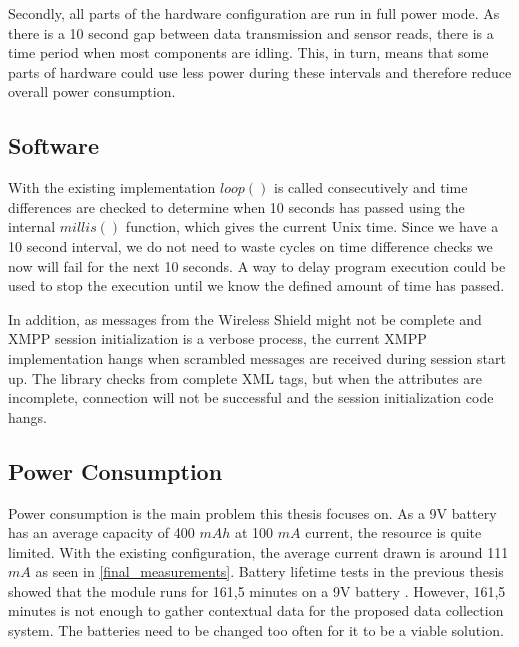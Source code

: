 Secondly, all parts of the hardware configuration are run in full power mode. As there is a 10 second gap between data transmission and sensor reads, there is a time period when most components are idling. This, in turn, means that some parts of hardware could use less power during these intervals and therefore reduce overall power consumption.

\subsection{Software}

With the existing implementation $loop()$ is called consecutively and time differences are checked to determine when 10 seconds has passed using the internal $millis()$ function, which gives the current Unix time. Since we have a 10 second interval, we do not need to waste cycles on time difference checks we now will fail for the next 10 seconds. A way to delay program execution could be used to stop the execution until we know the defined amount of time has passed. 

In addition, as messages from the Wireless Shield might not be complete and  XMPP session initialization is a verbose process, the current XMPP implementation hangs when scrambled messages are received during session start up. The library checks from complete XML tags, but when the attributes are incomplete, connection will not be successful and the session initialization code hangs.

\subsection{Power Consumption}

Power consumption is the main problem this thesis focuses on. As a 9V battery has an average capacity of 400 $mAh$ at 100 $mA$ current, the resource is quite limited. With the existing configuration, the average current drawn is around 111$mA$ as seen in \autoref{final_measurements}. Battery lifetime tests in the previous thesis showed that the module runs for 161,5 minutes on a 9V battery \cite[p. 50]{prev_thesis}. However, 161,5 minutes is not enough to gather contextual data for the proposed data collection system. The batteries need to be changed too often for it to be a viable solution.


